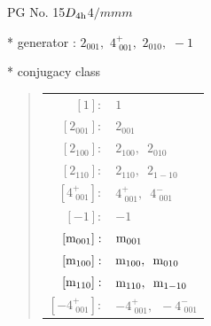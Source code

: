 \documentclass[fleqn,8pt]{jsarticle}
\begin{document}
\setcounter{MaxMatrixCols}{32}

\renewcommand{\tablename}{Table~}
\renewcommand{\figurename}{Figure~}
\begin{center}
\LARGE
PG No. 15\quad$D_{\rm 4h}$\quad$4/mmm$\quad[ tetragonal ]
\end{center}

* generator : $2{}_{001},\,\,4^{+}_{\,\,001},\,\,2{}_{010},\,\,-1$

* conjugacy class
\begin{quote}
\begin{tabular}{rl}
$ [1]: $ & $ 1 $ \\
$ [2{}_{001}]: $ & $ 2{}_{001} $ \\
$ [2{}_{100}]: $ & $ 2{}_{100},\,\,\,2{}_{010} $ \\
$ [2{}_{110}]: $ & $ 2{}_{110},\,\,\,2{}_{1-10} $ \\
$ [4^{+}_{\,\,001}]: $ & $ 4^{+}_{\,\,001},\,\,\,4^{-}_{\,\,001} $ \\
$ [-1]: $ & $ -1 $ \\
$ [{\rm m}_{001}]: $ & $ {\rm m}_{001} $ \\
$ [{\rm m}_{100}]: $ & $ {\rm m}_{100},\,\,\,{\rm m}_{010} $ \\
$ [{\rm m}_{110}]: $ & $ {\rm m}_{110},\,\,\,{\rm m}_{1-10} $ \\
$ [-4^{+}_{\,\,001}]: $ & $ -4^{+}_{\,\,001},\,\,\,-4^{-}_{\,\,001} $
\end{tabular}
\end{quote}
\end{document}
